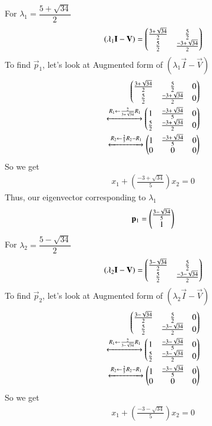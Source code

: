 \documentclass[journal,12pt,twocolumn]{IEEEtran}
\begin{document}
For $\lambda_1=\dfrac{5+\sqrt{34}}{2}$
\begin{align}
    (\lambda_1\mathbf{I}-\mathbf{V}) = \begin{pmatrix}\frac{3+\sqrt{34}}{2} & \frac{5}{2} \\ \frac{5}{2} & \frac{-3 +\sqrt{34}}{2}\end{pmatrix}
\end{align}
To find $\vec{p}_1$, let's look at Augmented form of $(\lambda_1\vec{I}-\vec{V})$
\begin{align}
    \begin{pmatrix}\frac{3+\sqrt{34}}{2} & \frac{5}{2} & 0 \\ \frac{5}{2} & \frac{-3 +\sqrt{34}}{2} & 0\end{pmatrix}\\\xleftrightarrow{R_1 \leftarrow \frac{2}{3+\sqrt{34}}R_1}\begin{pmatrix}1 & \frac{-3+\sqrt{34}}{5} & 0 \\ \frac{5}{2} & \frac{-3 +\sqrt{34}}{2} & 0\end{pmatrix}\\\xleftrightarrow{R_2\leftarrow \frac{2}{5}R_2 - R_1}\begin{pmatrix}1 & \frac{-3+\sqrt{34}}{5} & 0 \\ 0&0&0\end{pmatrix}
\end{align}
So we get
\begin{align}
    x_1 + \left(\frac{-3+\sqrt{34}}{5}\right) x_2 = 0
\end{align}
Thus, our eigenvector corresponding to $\lambda_1$
\begin{align}
    \mathbf{p}_1 = \begin{pmatrix}\frac{3-\sqrt{34}}{5} \\ 1\end{pmatrix}
\end{align}
For $\lambda_2=\dfrac{5-\sqrt{34}}{2}$
\begin{align}
    (\lambda_2\mathbf{I}-\mathbf{V}) = \begin{pmatrix}\frac{3-\sqrt{34}}{2} & \frac{5}{2} \\ \frac{5}{2} & \frac{-3 -\sqrt{34}}{2}\end{pmatrix}
\end{align}
To find $\vec{p}_2$, let's look at Augmented form of $(\lambda_2\vec{I}-\vec{V})$
\begin{align}
    \begin{pmatrix}\frac{3-\sqrt{34}}{2} & \frac{5}{2} & 0 \\ \frac{5}{2} & \frac{-3 -\sqrt{34}}{2} & 0\end{pmatrix}\\\xleftrightarrow{R_1 \leftarrow \frac{2}{3-\sqrt{34}}R_1}\begin{pmatrix}1 & \frac{-3-\sqrt{34}}{5} & 0 \\ \frac{5}{2} & \frac{-3 -\sqrt{34}}{2} & 0\end{pmatrix}\\\xleftrightarrow{R_2\leftarrow \frac{2}{5}R_2 - R_1}\begin{pmatrix}1 & \frac{-3-\sqrt{34}}{5} & 0 \\ 0&0&0\end{pmatrix}
\end{align}
So we get
\begin{align}
    x_1 + \left(\frac{-3-\sqrt{34}}{5}\right) x_2 = 0
\end{align}
\end{document}
